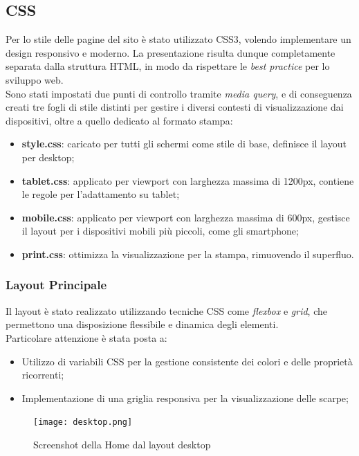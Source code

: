 \documentclass[a4paper, 12pt]{article}
\begin{document}
\begin{justify}
\subsection{CSS}

Per lo stile delle pagine del sito è stato utilizzato CSS3, volendo implementare un design responsivo e moderno. La presentazione risulta dunque completamente separata dalla struttura HTML, in modo da rispettare le \textit{best practice} per lo sviluppo web.\\ 
Sono stati impostati due punti di controllo tramite \textit{media query}, e di conseguenza creati tre fogli di stile distinti per gestire i diversi contesti di visualizzazione dai dispositivi, oltre a quello dedicato al formato stampa:
\begin{itemize}
    \item \textbf{style.css}: caricato per tutti gli schermi come stile di base, definisce il layout per desktop;
    \item \textbf{tablet.css}: applicato per viewport con larghezza massima di 1200px, contiene le regole per l'adattamento su tablet;
    \item \textbf{mobile.css}: applicato per viewport con larghezza massima di 600px, gestisce il layout per i dispositivi mobili più piccoli, come gli smartphone;
    \item \textbf{print.css}: ottimizza la visualizzazione per la stampa, rimuovendo il superfluo.
\end{itemize}

\subsubsection{Layout Principale}

Il layout è stato realizzato utilizzando tecniche CSS come \textit{flexbox} e \textit{grid}, che permettono una disposizione flessibile e dinamica degli elementi.\\ Particolare attenzione è stata posta a:
\begin{itemize}
    \item Utilizzo di variabili CSS per la gestione consistente dei colori e delle proprietà ricorrenti;
    \item Implementazione di una griglia responsiva per la visualizzazione delle scarpe;
\end{itemize}

\begin{figure}[h]
    \centering
    \texttt{[image: desktop.png]}
    \caption{Screenshot della Home dal layout desktop}
\end{figure}


\end{justify}
\end{document}
